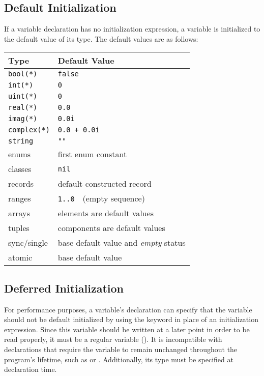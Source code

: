 \subsection{Default Initialization}
\label{Default_Values_For_Types}

If a variable declaration has no initialization expression, a variable
is initialized to the default value of its type.  The default values
are as follows:
\begin{center}
\begin{tabular}{|l|l|}
\hline
{\bf Type} & {\bf Default Value} \\
\hline
{\tt bool(*)} & {\tt false} \\
{\tt int(*)} & {\tt 0} \\
{\tt uint(*)} & {\tt 0} \\
{\tt real(*)} & {\tt 0.0} \\
{\tt imag(*)} & {\tt 0.0i} \\
{\tt complex(*)} & {\tt 0.0 + 0.0i} \\
{\tt string} & {\tt ""} \\
enums & first enum constant \\
classes & {\tt nil} \\
records & default constructed record \\
ranges & {\tt 1..0} $ $ $ $ (empty sequence) \\
arrays & elements are default values \\
tuples & components are default values \\
sync/single & base default value and \emph{empty} status \\
atomic & base default value \\
\hline
\end{tabular}
\end{center}

\subsection{Deferred Initialization}
\label{Noinit_Capability}

For performance purposes, a variable's declaration can specify that
the variable should not be default initialized by using
the  keyword in place of an initialization expression.
Since this variable should be written at a later point in order to be
read properly, it must be a regular variable ().  It is
incompatible with declarations that require the variable to remain
unchanged throughout the program's lifetime, such as 
or .  Additionally, its type must be specified at
declaration time.

